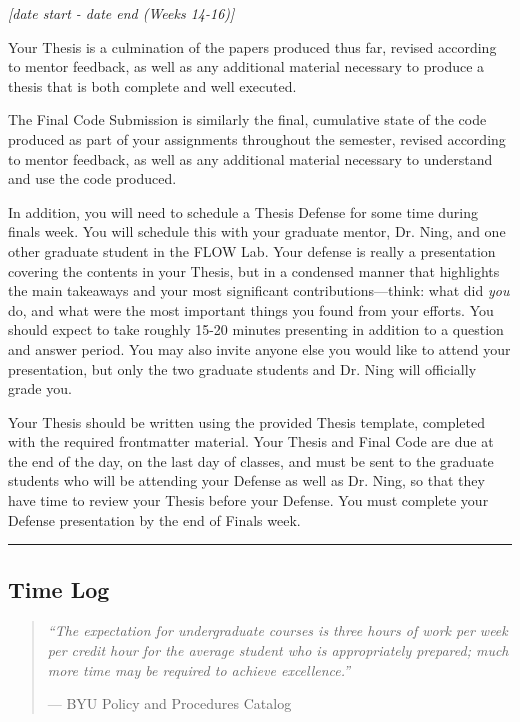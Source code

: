 \documentclass[12pt]{article}
\begin{document}
\textit{[date start - date end (Weeks 14-16)]}

\bigskip

Your Thesis is a culmination of the papers produced thus far, revised according to mentor feedback, as well as any additional material necessary to produce a thesis that is both complete and well executed.

The Final Code Submission is similarly the final, cumulative state of the code produced as part of your assignments throughout the semester, revised according to mentor feedback, as well as any additional material necessary to understand and use the code produced.

In addition, you will need to schedule a Thesis Defense for some time during finals week.
You will schedule this with your graduate mentor, Dr. Ning, and one other graduate student in the FLOW Lab.
Your defense is really a presentation covering the contents in your Thesis, but in a condensed manner that highlights the main takeaways and your most significant contributions---think: what did \textit{you} do, and what were the most important things you found from your efforts.
You should expect to take roughly 15-20 minutes presenting in addition to a question and answer period.
You may also invite anyone else you would like to attend your presentation, but only the two graduate students and Dr. Ning will officially grade you.

Your Thesis should be written using the provided Thesis template, completed with the required frontmatter material.
Your Thesis and Final Code are due at the end of the day, on the last day of classes, and must be sent to the graduate students who will be attending your Defense as well as Dr. Ning, so that they have time to review your Thesis before your Defense.
You must complete your Defense presentation by the end of Finals week.


\vspace{1em}\hrule\vspace{1em}
\subsection{Time Log}
\label{sec:timelog}

\begin{quote}
\textit{``The expectation for undergraduate courses is three hours of work per week per credit hour for the average student who is appropriately prepared; much more time may be required to achieve excellence.'' }

--- BYU Policy and Procedures Catalog
\end{quote}
\end{document}

